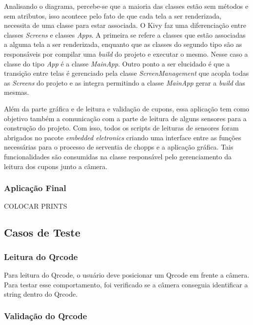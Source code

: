 Analisando o diagrama, percebe-se que a maioria das classes estão sem métodos e sem atributos,
isso acontece pelo fato de que cada tela a ser renderizada, necessita de uma classe para estar
associada. O Kivy faz uma diferenciação entre classes \textit{Screens} e classes \textit{Apps}.
A primeira se refere a classes que estão associadas a alguma tela a ser renderizada, enquanto
que as classes do segundo tipo são as responsáveis por compilar uma \textit{build} do projeto
e executar o mesmo. Nesse caso a classe do tipo \textit{App} é a classe \textit{MainApp}. Outro
ponto a ser elucidado é que a transição entre telas é gerenciado pela classe
\textit{ScreenManagement} que acopla todas as \textit{Screens} do projeto e as integra permitindo
a classe \textit{MainApp} gerar a \textit{build} das mesmas.

Além da parte gráfica e de leitura e validação de cupons, essa aplicação tem como objetivo
também a comunicação com a parte de leitura de alguns sensores para a construção do projeto.
Com isso, todos os scripts de leituras de sensores foram abrigados no pacote
\textit{embedded eletronics} criando uma interface entre as funções necessárias para o processo
de serventia de chopps e a aplicação gráfica. Tais funcionalidades são consumidas na classe
responsável pelo gerenciamento da leitura dos cupons junto a câmera.

\subsubsection{Aplicação Final}

COLOCAR PRINTS

\subsection{Casos de Teste}

\subsubsection{Leitura do Qrcode}

Para leitura do Qrcode, o usuário deve posicionar um Qrcode em frente a câmera.
Para testar esse comportamento, foi verificado se a câmera conseguia identificar a string dentro do Qrcode.

\subsubsection{Validação do Qrcode}


